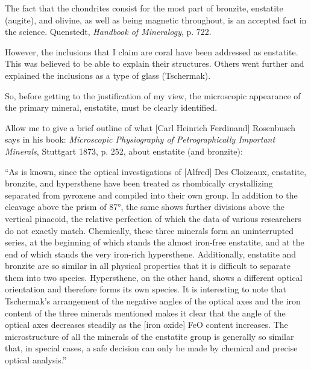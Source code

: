 \documentclass[a4paper, 12pt, oneside]{article}
\begin{document}
The fact that the chondrites consist for the most part of bronzite, enstatite (augite), and olivine, as well as being magnetic throughout, is an accepted fact in the science. Quenstedt, \emph{Handbook of Mineralogy}, p. 722.

However, the inclusions that I claim are coral have been addressed as enstatite. This was believed to be able to explain their structures. Others went further and explained the inclusions as a type of glass (Tschermak).

So, before getting to the justification of my view, the microscopic appearance of the primary mineral, enstatite, must be clearly identified.

Allow me to give a brief outline of what [Carl Heinrich Ferdinand] Rosenbusch says in his book: \emph{Microscopic Physiography of Petrographically Important Minerals}, Stuttgart 1873, p. 252, about enstatite (and bronzite):

``As is known, since the optical investigations of [Alfred] Des Cloizeaux, enstatite, bronzite, and hypersthene have been treated as rhombically crystallizing separated from pyroxene and compiled into their own group. In addition to the cleavage above the prism of 87°, the same shows further divisions above the vertical pinacoid, the relative perfection of which the data of various researchers do not exactly match. Chemically, these three minerals form an uninterrupted series, at the beginning of which stands the almost iron-free enstatite, and at the end of which stands the very iron-rich hypersthene. Additionally, enstatite and bronzite are so similar in all physical properties that it is difficult to separate them into two species. Hypersthene, on the other hand, shows a different optical orientation and therefore forms its own species. It is interesting to note that Tschermak's arrangement of the negative angles of the optical axes and the iron content of the three minerals mentioned makes it clear that the angle of the optical axes decreases steadily as the [iron oxide] FeO content increases. The microstructure of all the minerals of the enstatite group is generally so similar that, in special cases, a safe decision can only be made by chemical and precise optical analysis.''
\end{document}
